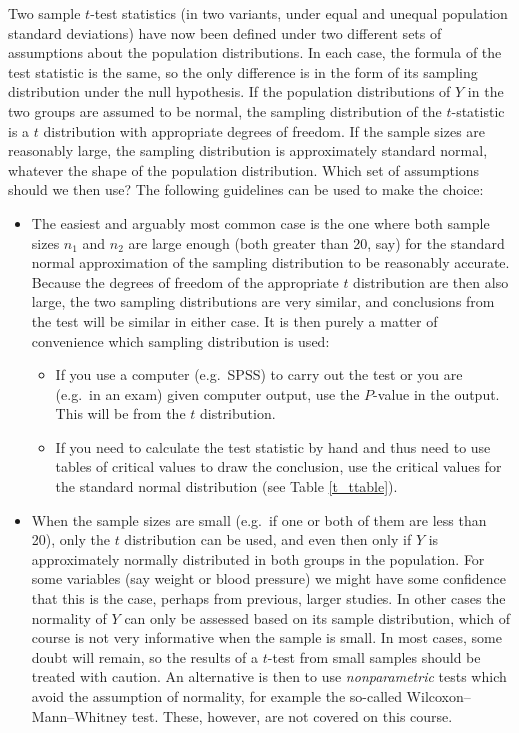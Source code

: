 Two sample $t$-test statistics (in two variants, under equal and unequal
population standard deviations) have now been defined under two different
sets of assumptions about the population distributions.
In each case, the formula of the test statistic is
the same, so the only difference is in the form of its sampling
distribution under the null hypothesis. If the population distributions
of $Y$ in the two groups are assumed to be normal, the sampling
distribution of the $t$-statistic is a $t$ distribution with appropriate
degrees of freedom. If the sample sizes are reasonably large, the
sampling distribution is approximately standard normal, whatever the
shape of the population distribution. Which set of assumptions should we
then use? The following guidelines can be used to make the
choice:
\begin{itemize}
\item
The easiest and arguably most common case is the one where both sample
sizes $n_{1}$ and $n_{2}$ are large enough (both greater than 20, say)
for the standard normal approximation of the sampling distribution to be
reasonably accurate. Because the degrees of freedom of the appropriate
$t$ distribution are then also large, the two sampling distributions are
very similar, and conclusions from the test will be similar in either
case. It is then
purely a matter of convenience which sampling distribution is used:
\begin{itemize}
\item
If you use a computer (e.g.\ SPSS) to carry out the test or you are
(e.g.\ in an exam) given computer output, use the $P$-value in the
output. This will be from the $t$ distribution.
\item
If you need to calculate the test statistic by hand and thus need to use
tables of critical values to draw the conclusion, use the critical
values for the standard normal distribution (see Table \ref{t_ttable}).
\end{itemize}
\item
When the sample sizes are small (e.g.\ if one or both of them are less
than 20), only the $t$ distribution can be used, and even then only
if $Y$ is approximately normally
distributed in both groups in the population.
For some variables
(say weight or blood pressure) we might have some confidence that this
is the case, perhaps from previous, larger studies. In other cases
the normality of $Y$ can only be assessed based on its sample
distribution, which of course is not very informative when the sample is
small. In most cases, some doubt will remain, so the results of a
$t$-test from small samples should be treated with caution. An
alternative is then to use \emph{nonparametric} tests which avoid the
assumption of normality, for example the so-called Wilcoxon--Mann--Whitney test.
These, however,
are not covered on
this course.
\end{itemize}
